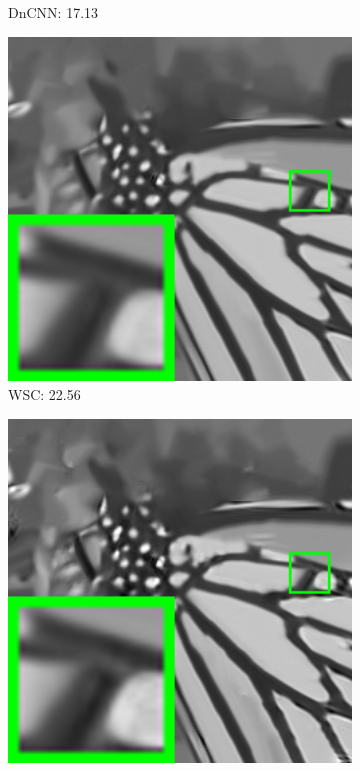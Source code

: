 \begin{figure}
\begin{adjustwidth}{-2cm}{}
\begin{subfigure}[t]{0.19\textwidth}
		\caption{DnCNN: 17.13}
    \end{subfigure}
    \hfill
    \begin{subfigure}[t]{0.19\textwidth}
        \centering
        \includegraphics[width=1\textwidth]{images/twsc/awgn/br_WSC_100_monarch.png}
		\caption{WSC: 22.56}
    \end{subfigure}
    \hfill
    \begin{subfigure}[t]{0.19\textwidth}
        \centering
        \includegraphics[width=1\textwidth]{images/twsc/awgn/br_WLSWSC_100_monarch.png}

\end{subfigure}
\end{adjustwidth}
\end{figure}
